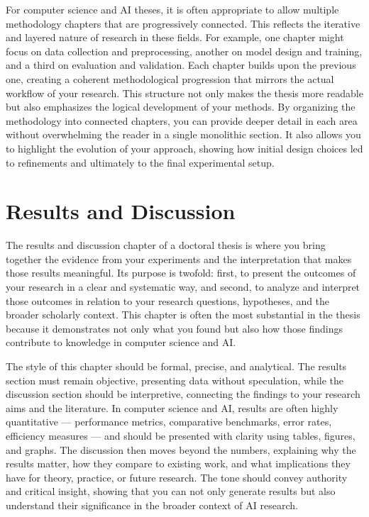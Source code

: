 \documentclass[PCOM,Thesis,Review]{mpThesis}
\begin{document}
\begin{MainMatter}
\begin{Remark}
For computer science and AI theses, it is often appropriate to allow multiple methodology chapters that are progressively connected.
This reflects the iterative and layered nature of research in these fields.
For example, one chapter might focus on data collection and preprocessing, another on model design and training, and a third on evaluation and validation.
Each chapter builds upon the previous one, creating a coherent methodological progression that mirrors the actual workflow of your research.
This structure not only makes the thesis more readable but also emphasizes the logical development of your methods.
By organizing the methodology into connected chapters, you can provide deeper detail in each area without overwhelming the reader in a single monolithic section.
It also allows you to highlight the evolution of your approach, showing how initial design choices led to refinements and ultimately to the final experimental setup.
\end{Remark}

\chapter{Results and Discussion}
\label{ch:pre-result}
\minitoc

\begin{Remark}
The results and discussion chapter of a doctoral thesis is where you bring together the evidence from your experiments and the interpretation that makes those results meaningful.
Its purpose is twofold: first, to present the outcomes of your research in a clear and systematic way,
and second, to analyze and interpret those outcomes in relation to your research questions, hypotheses, and the broader scholarly context.
This chapter is often the most substantial in the thesis because it demonstrates not only what you found but also how those findings contribute to knowledge in computer science and AI.

The style of this chapter should be formal, precise, and analytical.
The results section must remain objective, presenting data without speculation, while the discussion section should be interpretive, connecting the findings to your research aims and the literature.
In computer science and AI, results are often highly quantitative ---
performance metrics, comparative benchmarks, error rates, efficiency measures ---
and should be presented with clarity using tables, figures, and graphs.
The discussion then moves beyond the numbers, explaining why the results matter, how they compare to existing work, and what implications they have for theory, practice, or future research.
The tone should convey authority and critical insight, showing that you can not only generate results but also understand their significance in the broader context of AI research.


\end{Remark}
\end{MainMatter}
\end{document}
